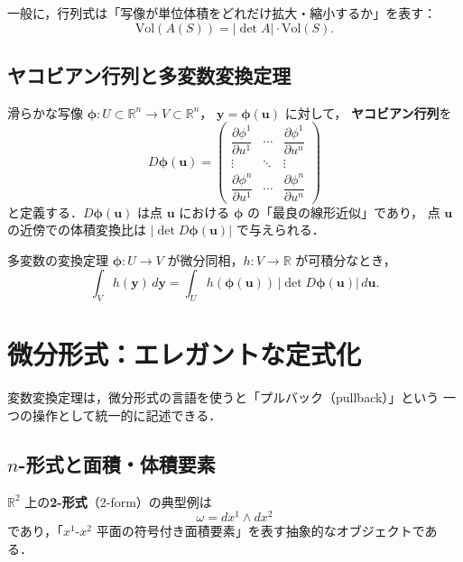 \documentclass[lualatex,ja=standard,a4paper,12pt]{bxjsarticle}
\begin{document}
一般に，行列式は「写像が単位体積をどれだけ拡大・縮小するか」を表す：
\[
  \mathrm{Vol}(A(S)) = |\det A| \cdot \mathrm{Vol}(S).
\]

\subsection{ヤコビアン行列と多変数変換定理}

滑らかな写像 $\boldsymbol{\phi}: U \subset \mathbb{R}^n \to V \subset \mathbb{R}^n$，
$\mathbf{y} = \boldsymbol{\phi}(\mathbf{u})$ に対して，
\textbf{ヤコビアン行列}を
\[
  D\boldsymbol{\phi}(\mathbf{u})
  = \begin{pmatrix}
    \dfrac{\partial \phi^1}{\partial u^1} & \cdots & \dfrac{\partial \phi^1}{\partial u^n} \\[8pt]
    \vdots & \ddots & \vdots \\[4pt]
    \dfrac{\partial \phi^n}{\partial u^1} & \cdots & \dfrac{\partial \phi^n}{\partial u^n}
    \end{pmatrix}
\]
と定義する．$D\boldsymbol{\phi}(\mathbf{u})$ は点 $\mathbf{u}$ における $\boldsymbol{\phi}$ の「最良の線形近似」であり，
点 $\mathbf{u}$ の近傍での体積変換比は $|\det D\boldsymbol{\phi}(\mathbf{u})|$ で与えられる．

\begin{thmbox}{多変数の変換定理}
$\boldsymbol{\phi}: U \to V$ が微分同相，$h: V \to \mathbb{R}$ が可積分なとき，
\[
  \int_V h(\mathbf{y})\, d\mathbf{y}
  = \int_U h(\boldsymbol{\phi}(\mathbf{u}))\, |\det D\boldsymbol{\phi}(\mathbf{u})|\, d\mathbf{u}.
\]
\end{thmbox}

\section{微分形式：エレガントな定式化}

変数変換定理は，微分形式の言語を使うと「プルバック（pullback）」という
一つの操作として統一的に記述できる．

\subsection{$n$-形式と面積・体積要素}

$\mathbb{R}^2$ 上の\textbf{2-形式}（2-form）の典型例は
\[
  \omega = dx^1 \wedge dx^2
\]
であり，「$x^1$-$x^2$ 平面の符号付き面積要素」を表す抽象的なオブジェクトである．
\end{document}
